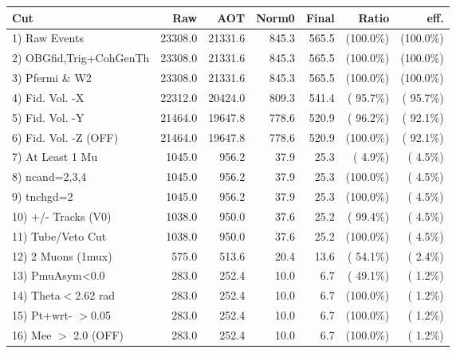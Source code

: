  \begin{table}[h!]\centering
 \begin{tabular}{||l||r|r|r|r|r|r||}
 \hline
 \hline
 Cut & Raw & AOT & Norm0 & Final & Ratio & eff.       \\
 \hline
  1) Raw Events           &      23308.0 &      21331.6 &        845.3 &        565.5 & (100.0\%) & (100.0\%) \\
  2) OBGfid,Trig+CohGenTh &      23308.0 &      21331.6 &        845.3 &        565.5 & (100.0\%) & (100.0\%) \\
  3) Pfermi \& W2         &      23308.0 &      21331.6 &        845.3 &        565.5 & (100.0\%) & (100.0\%) \\
  4) Fid. Vol. -X         &      22312.0 &      20424.0 &        809.3 &        541.4 & ( 95.7\%) & ( 95.7\%) \\
  5) Fid. Vol. -Y         &      21464.0 &      19647.8 &        778.6 &        520.9 & ( 96.2\%) & ( 92.1\%) \\
  6) Fid. Vol. -Z (OFF)   &      21464.0 &      19647.8 &        778.6 &        520.9 & (100.0\%) & ( 92.1\%) \\
  7) At Least 1 Mu        &       1045.0 &        956.2 &         37.9 &         25.3 & (  4.9\%) & (  4.5\%) \\
  8) ncand=2,3,4          &       1045.0 &        956.2 &         37.9 &         25.3 & (100.0\%) & (  4.5\%) \\
  9) tnchgd=2             &       1045.0 &        956.2 &         37.9 &         25.3 & (100.0\%) & (  4.5\%) \\
 10) +/- Tracks (V0)      &       1038.0 &        950.0 &         37.6 &         25.2 & ( 99.4\%) & (  4.5\%) \\
 11) Tube/Veto Cut        &       1038.0 &        950.0 &         37.6 &         25.2 & (100.0\%) & (  4.5\%) \\
 12) 2 Muons (1mux)       &        575.0 &        513.6 &         20.4 &         13.6 & ( 54.1\%) & (  2.4\%) \\
 13) PmuAsym<0.0          &        283.0 &        252.4 &         10.0 &          6.7 & ( 49.1\%) & (  1.2\%) \\
 14) Theta$<$2.62 rad     &        283.0 &        252.4 &         10.0 &          6.7 & (100.0\%) & (  1.2\%) \\
 15) Pt+wrt- $>$0.05      &        283.0 &        252.4 &         10.0 &          6.7 & (100.0\%) & (  1.2\%) \\
 16) Mee $>$ 2.0  (OFF)   &        283.0 &        252.4 &         10.0 &          6.7 & (100.0\%) & (  1.2\%) \\

\end{tabular}
\end{table}
